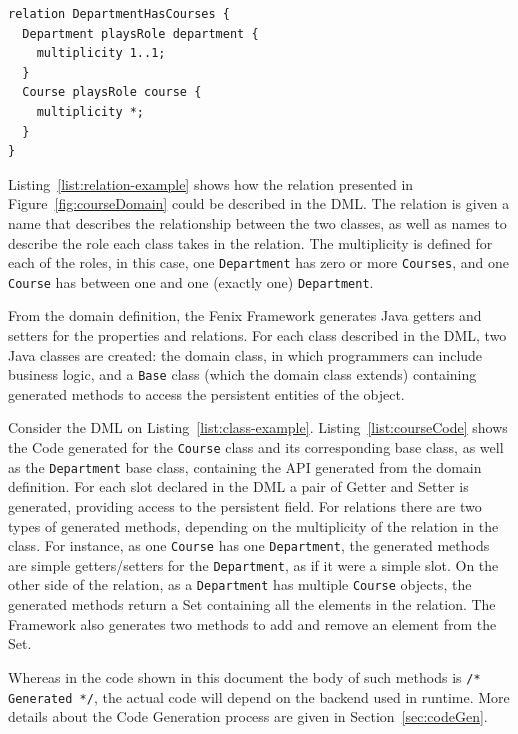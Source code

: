 \documentclass{llncs}
\begin{document}
\begin{lstlisting}[caption={DML for the relation between \texttt{Course}
    and \texttt{Department}},label={list:relation-example}]
relation DepartmentHasCourses {
  Department playsRole department {
    multiplicity 1..1;
  }
  Course playsRole course {
    multiplicity *;
  }
}
\end{lstlisting}

Listing~\ref{list:relation-example} shows how the relation presented
in Figure~\ref{fig:courseDomain} could be described in the DML. The
relation is given a name that describes the relationship between the
two classes, as well as names to describe the role each class takes in
the relation. The multiplicity is defined for each of the roles, in
this case, one \texttt{Department} has zero or more \texttt{Courses},
and one \texttt{Course} has between one and one (exactly one)
\texttt{Department}.


From the domain definition, the Fenix Framework generates Java getters
and setters for the properties and relations. For each class described
in the DML, two Java classes are created: the domain class, in which
programmers can include business logic, and a \texttt{Base} class
(which the domain class extends) containing generated methods to
access the persistent entities of the object.

Consider the DML on
Listing~\ref{list:class-example}. Listing~\ref{list:courseCode} shows
the Code generated for the \texttt{Course} class and its corresponding
base class, as well as the \texttt{Department} base class, containing
the API generated from the domain definition. For each slot declared
in the DML a pair of Getter and Setter is generated, providing access
to the persistent field. For relations there are two types of
generated methods, depending on the multiplicity of the relation in
the class. For instance, as one \texttt{Course} has one
\texttt{Department}, the generated methods are simple getters/setters
for the \texttt{Department}, as if it were a simple slot. On the other
side of the relation, as a \texttt{Department} has multiple
\texttt{Course} objects, the generated methods return a Set containing
all the elements in the relation. The Framework also generates two
methods to add and remove an element from the Set.

Whereas in the code shown in this document the body of such methods is
\texttt{/* Generated */}, the actual code will depend on the backend
used in runtime. More details about the Code Generation process are
given in Section~\ref{sec:codeGen}.
\end{document}
